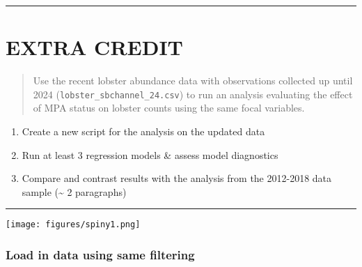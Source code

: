 \documentclass[
]{article}
\providecommand{\tightlist}{%
  \setlength{\itemsep}{0pt}\setlength{\parskip}{0pt}}
\begin{document}
\begin{center}\rule{0.5\linewidth}{0.5pt}\end{center}

\hypertarget{extra-credit}{%
\section{EXTRA CREDIT}\label{extra-credit}}

\begin{quote}
Use the recent lobster abundance data with observations collected up
until 2024 (\texttt{lobster\_sbchannel\_24.csv}) to run an analysis
evaluating the effect of MPA status on lobster counts using the same
focal variables.
\end{quote}

\begin{enumerate}
\def\labelenumi{\alph{enumi}.}
\tightlist
\item
  Create a new script for the analysis on the updated data
\item
  Run at least 3 regression models \& assess model diagnostics
\item
  Compare and contrast results with the analysis from the 2012-2018 data
  sample (\textasciitilde{} 2 paragraphs)
\end{enumerate}

\begin{center}\rule{0.5\linewidth}{0.5pt}\end{center}

\texttt{[image: figures/spiny1.png]}

\hypertarget{load-in-data-using-same-filtering}{%
\subsubsection{Load in data using same
filtering}\label{load-in-data-using-same-filtering}}
\end{document}

